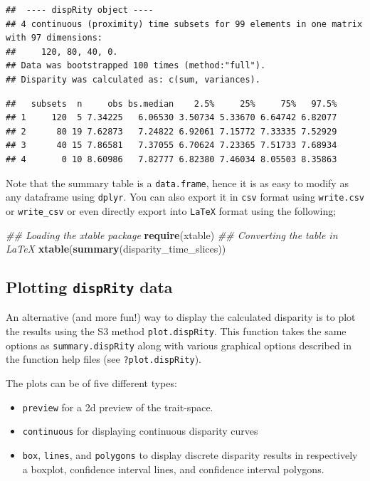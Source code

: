 \documentclass[]{book}
\newenvironment{Shaded}{\begin{snugshade}}{\end{snugshade}}
\newcommand{\CommentTok}[1]{\textcolor[rgb]{0.56,0.35,0.01}{\textit{#1}}}
\newcommand{\KeywordTok}[1]{\textcolor[rgb]{0.13,0.29,0.53}{\textbf{#1}}}
\newcommand{\NormalTok}[1]{#1}
\providecommand{\tightlist}{%
  \setlength{\itemsep}{0pt}\setlength{\parskip}{0pt}}
\begin{document}
\begin{verbatim}
##  ---- dispRity object ---- 
## 4 continuous (proximity) time subsets for 99 elements in one matrix with 97 dimensions:
##     120, 80, 40, 0.
## Data was bootstrapped 100 times (method:"full").
## Disparity was calculated as: c(sum, variances).
\end{verbatim}

\begin{verbatim}
##   subsets  n     obs bs.median    2.5%     25%     75%   97.5%
## 1     120  5 7.34225   6.06530 3.50734 5.33670 6.64742 6.82077
## 2      80 19 7.62873   7.24822 6.92061 7.15772 7.33335 7.52929
## 3      40 15 7.86581   7.37055 6.70624 7.23365 7.51733 7.68934
## 4       0 10 8.60986   7.82777 6.82380 7.46034 8.05503 8.35863
\end{verbatim}

Note that the summary table is a \texttt{data.frame}, hence it is as easy to modify as any dataframe using \texttt{dplyr}.
You can also export it in \texttt{csv} format using \texttt{write.csv} or \texttt{write\_csv} or even directly export into \texttt{LaTeX} format using the following;

\begin{Shaded}
\begin{Highlighting}[]
\CommentTok{## Loading the xtable package}
\KeywordTok{require}\NormalTok{(xtable)}
\CommentTok{## Converting the table in LaTeX}
\KeywordTok{xtable}\NormalTok{(}\KeywordTok{summary}\NormalTok{(disparity_time_slices))}
\end{Highlighting}
\end{Shaded}

\hypertarget{plotting-disprity-data}{%
\subsection{\texorpdfstring{Plotting \texttt{dispRity} data}{Plotting dispRity data}}\label{plotting-disprity-data}}

An alternative (and more fun!) way to display the calculated disparity is to plot the results using the S3 method \texttt{plot.dispRity}.
This function takes the same options as \texttt{summary.dispRity} along with various graphical options described in the function help files (see \texttt{?plot.dispRity}).

The plots can be of five different types:

\begin{itemize}
\tightlist
\item
  \texttt{preview} for a 2d preview of the trait-space.
\item
  \texttt{continuous} for displaying continuous disparity curves
\item
  \texttt{box}, \texttt{lines}, and \texttt{polygons} to display discrete disparity results in respectively a boxplot, confidence interval lines, and confidence interval polygons.
\end{itemize}
\end{document}
